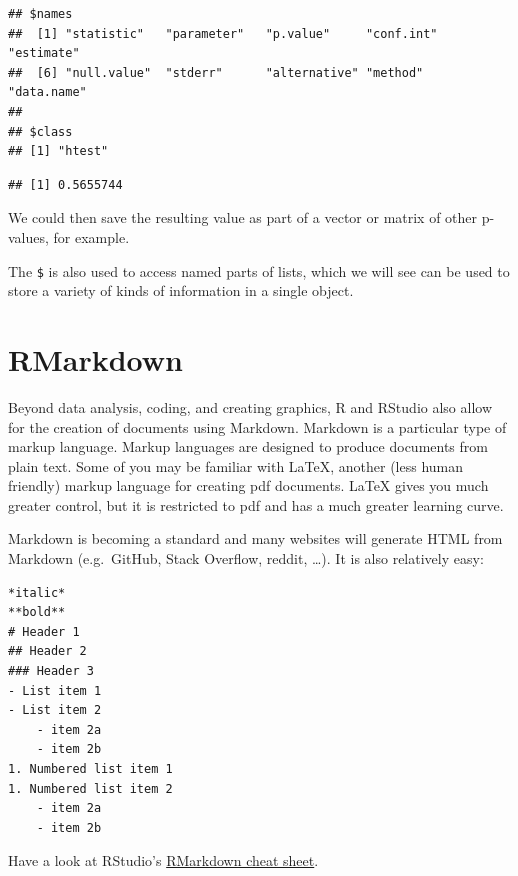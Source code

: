 \documentclass[
]{book}
\newenvironment{Shaded}{\begin{snugshade}}{\end{snugshade}}
\newcommand{\NormalTok}[1]{#1}
\newcommand{\SpecialCharTok}[1]{\textcolor[rgb]{0.00,0.00,0.00}{#1}}
\begin{document}
\begin{verbatim}
## $names
##  [1] "statistic"   "parameter"   "p.value"     "conf.int"    "estimate"   
##  [6] "null.value"  "stderr"      "alternative" "method"      "data.name"  
## 
## $class
## [1] "htest"
\end{verbatim}

\begin{Shaded}
\end{Shaded}

\begin{verbatim}
## [1] 0.5655744
\end{verbatim}

We could then save the resulting value as part of a vector or matrix of other p-values, for example.

The \texttt{\$} is also used to access named parts of lists, which we will see can be used to store a variety of kinds of information in a single object.

\hypertarget{rmarkdown}{%
\section{RMarkdown}\label{rmarkdown}}

Beyond data analysis, coding, and creating graphics, R and RStudio also allow for the creation of documents using Markdown. Markdown is a particular type of markup language. Markup languages are designed to produce documents from plain text. Some of you may be familiar with LaTeX, another (less human friendly) markup language for creating pdf documents. LaTeX gives you much greater control, but it is restricted to pdf and has a much greater learning curve.

Markdown is becoming a standard and many websites will generate HTML from Markdown (e.g.~GitHub, Stack Overflow, reddit, \ldots). It is also relatively easy:

\begin{verbatim}
*italic*
**bold**
# Header 1
## Header 2
### Header 3
- List item 1
- List item 2
    - item 2a
    - item 2b
1. Numbered list item 1
1. Numbered list item 2
    - item 2a
    - item 2b
\end{verbatim}

Have a look at RStudio's \href{https://www.rstudio.com/resources/cheatsheets/}{RMarkdown cheat sheet}.
\end{document}
